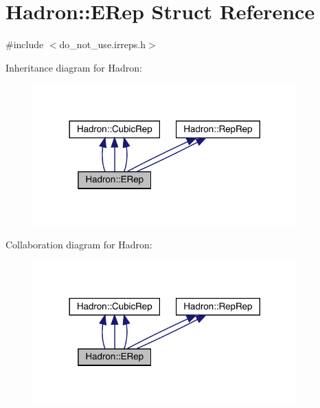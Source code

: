 \hypertarget{structHadron_1_1ERep}{}\section{Hadron\+:\+:E\+Rep Struct Reference}
\label{structHadron_1_1ERep}


{\ttfamily \#include $<$do\+\_\+not\+\_\+use.\+irreps.\+h$>$}



Inheritance diagram for Hadron\+:
\nopagebreak
\begin{figure}[H]
\begin{center}
\leavevmode
\includegraphics[width=288pt]{d0/d05/structHadron_1_1ERep__inherit__graph}
\end{center}
\end{figure}


Collaboration diagram for Hadron\+:
\nopagebreak
\begin{figure}[H]
\begin{center}
\leavevmode
\includegraphics[width=288pt]{d4/d5d/structHadron_1_1ERep__coll__graph}
\end{center}
\end{figure}
